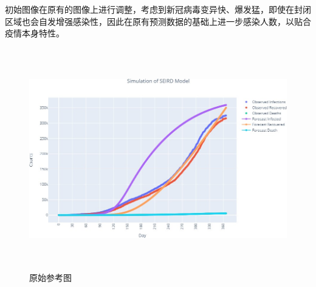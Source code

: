 \documentclass[withoutpreface,bwprint]{cumcmthesis} %
\begin{document}
初始图像在原有的图像上进行调整，考虑到新冠病毒变异快、爆发猛，即使在封闭区域也会自发增强感染性，因此在原有预测数据的基础上进一步感染人数，以贴合疫情本身特性。
\begin{figure}[!htp]
    \centering
    \includegraphics[width=15.6cm,height=9.64cm]{figures/original.png}
    \caption{原始参考图}
\end{figure}
\end{document}

